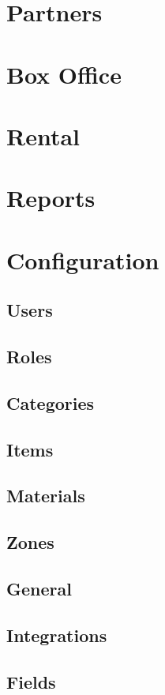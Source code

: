 \documentclass[]{memoir}
\begin{document}
\section{Partners}

\section{Box Office}

\section{Rental}

\section{Reports}

\section{Configuration}
\subsection{Users}
\subsection{Roles}
\subsection{Categories}
\subsection{Items}
\subsection{Materials}
\subsection{Zones}
\subsection{General}
\subsection{Integrations}
\subsection{Fields}
\end{document}
